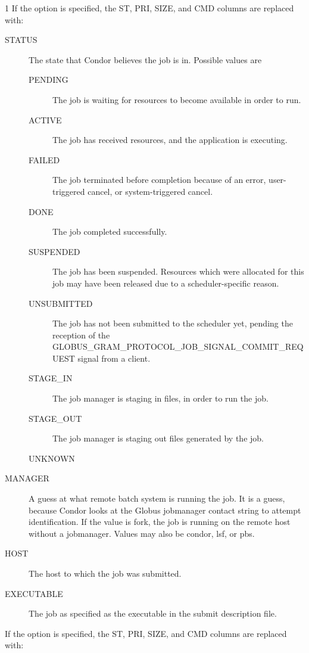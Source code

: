 \begin{ManPage}{\label{man-condor-q}}{1}
If the  option is specified, the ST, PRI, SIZE, and CMD
columns are replaced with:
\begin{description}
\item[STATUS] The state that Condor believes the job is in.
Possible values are
  \begin{description}
    \item[PENDING] The job is waiting for resources to become available
    in order to run.
    \item[ACTIVE] The job has received resources, and the application
    is executing.
    \item[FAILED] The job terminated before completion because of an error,
    user-triggered cancel, or system-triggered cancel.
    \item[DONE] The job completed successfully.
    \item[SUSPENDED] The job has been suspended.
    Resources which were allocated for this job may have been
    released due to a scheduler-specific reason.
    \item[UNSUBMITTED] The job has not been submitted to the scheduler yet,
    pending the reception of the 
    GLOBUS\_GRAM\_PROTOCOL\_JOB\_SIGNAL\_COMMIT\_REQUEST signal from a client.
    \item[STAGE\_IN] The job manager is staging in files,
    in order to run the job.
    \item[STAGE\_OUT] The job manager is staging out files
    generated by the job.
    \item[UNKNOWN]
  \end{description}
\item[MANAGER] 
A guess at what remote batch system is running the job.
It is a guess, because Condor looks at the Globus jobmanager contact
string to attempt identification.
If the value is fork, the job is running on the
remote host without a jobmanager.
Values may also be condor, lsf, or pbs.
\item[HOST] The host to which the job was submitted.
\item[EXECUTABLE] The job as specified as the executable in the
submit description file.
\end{description}

If the  option is specified, the ST, PRI, SIZE, and CMD
columns are replaced with:


\end{ManPage}
